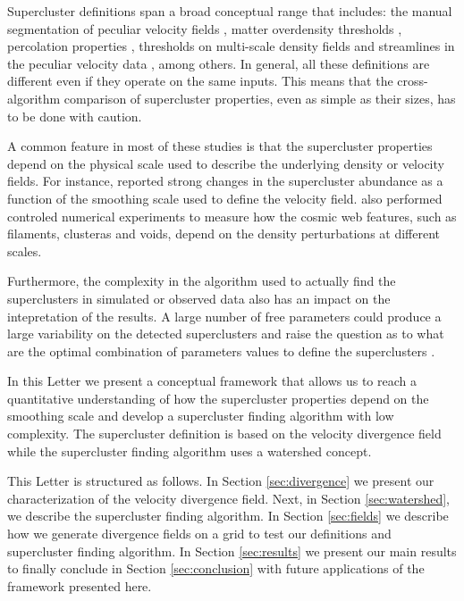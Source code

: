 \documentclass[usenatbib]{mnras}
\begin{document}
Supercluster definitions span a broad conceptual range that includes: the manual segmentation of peculiar velocity fields  \citep{2014Natur.513...71T}, matter overdensity thresholds \citep{2015A&A...575L..14C}, percolation properties \citep{Bagchi_2017}, thresholds on multi-scale density fields \citep{Einasto_2019,2020A&A...641A.172E} and streamlines in the peculiar velocity data \citep{Dupuy_2019}, among others.
In general, all these definitions are different even if they operate on the same inputs. 
This means that the cross-algorithm comparison of supercluster properties, even as simple as their sizes, has to be done with caution.


A common feature in most of these studies is that the supercluster properties depend on the physical scale used to describe the
underlying density or velocity fields.
For instance, \cite{Dupuy_2020} reported strong changes in the supercluster abundance as a function of the smoothing scale used to define the velocity field.
\cite{2011A&A...531A.149S} also performed controled numerical experiments to measure how the cosmic web features, such as filaments, clusteras and voids, depend on the density perturbations at different scales.



Furthermore, the complexity in the algorithm used to actually find the superclusters in simulated or observed data also has an impact on the intepretation of the results.
A large number of free parameters could produce a large variability on the detected superclusters and raise the question as to what are the optimal combination of parameters values to define the superclusters \citep{Dupuy_2020}.



In this Letter we present a conceptual framework that allows us to reach a quantitative understanding of how the supercluster properties depend on the smoothing scale and develop a supercluster finding algorithm with low complexity.
The supercluster definition is based on the velocity divergence field while the supercluster finding algorithm uses a watershed concept.


This Letter is structured as follows.
In Section \ref{sec:divergence} we present our characterization of the velocity divergence field.
Next, in Section \ref{sec:watershed}, we describe the supercluster finding algorithm.
In Section \ref{sec:fields} we describe how we generate divergence fields on a grid to test our definitions and supercluster finding algorithm.
In Section \ref{sec:results} we present our main results to finally conclude in Section \ref{sec:conclusion} with future applications of the framework presented here.
\end{document}
